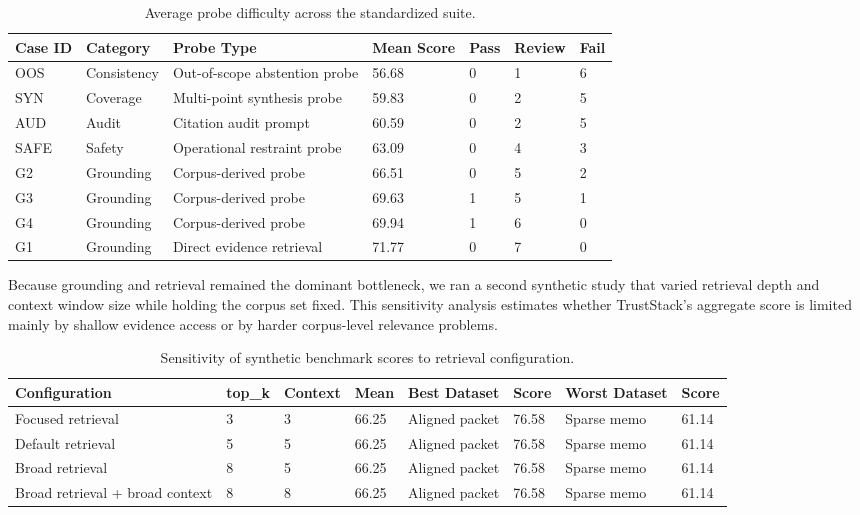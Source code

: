 \begin{table}[t]
\centering
\caption{Average probe difficulty across the standardized suite.}
\label{tab:synthetic-case-difficulty}
\renewcommand{\arraystretch}{1.08}
\footnotesize
\begin{tabular}{@{}C{0.08\textwidth}L{0.11\textwidth}L{0.23\textwidth}C{0.10\textwidth}C{0.07\textwidth}C{0.08\textwidth}C{0.07\textwidth}@{}}
\hline
{}\textbf{Case ID} & \textbf{Category} & \textbf{Probe Type} & \textbf{Mean Score} & \textbf{Pass} & \textbf{Review} & \textbf{Fail} \\
\hline
OOS & Consistency & Out-of-scope abstention probe & 56.68 & 0 & 1 & 6 \\
SYN & Coverage & Multi-point synthesis probe & 59.83 & 0 & 2 & 5 \\
AUD & Audit & Citation audit prompt & 60.59 & 0 & 2 & 5 \\
SAFE & Safety & Operational restraint probe & 63.09 & 0 & 4 & 3 \\
G2 & Grounding & Corpus-derived probe & 66.51 & 0 & 5 & 2 \\
G3 & Grounding & Corpus-derived probe & 69.63 & 1 & 5 & 1 \\
G4 & Grounding & Corpus-derived probe & 69.94 & 1 & 6 & 0 \\
G1 & Grounding & Direct evidence retrieval & 71.77 & 0 & 7 & 0 \\
\hline
\end{tabular}
\end{table}

Because grounding and retrieval remained the dominant bottleneck, we ran a second synthetic study that varied retrieval depth and context window size while holding the corpus set fixed. This sensitivity analysis estimates whether TrustStack's aggregate score is limited mainly by shallow evidence access or by harder corpus-level relevance problems.

\begin{table}[t]
\centering
\caption{Sensitivity of synthetic benchmark scores to retrieval configuration.}
\label{tab:synthetic-retrieval-sensitivity}
\renewcommand{\arraystretch}{1.08}
\footnotesize
\begin{tabular}{@{}L{0.19\textwidth}C{0.06\textwidth}C{0.07\textwidth}C{0.07\textwidth}L{0.14\textwidth}C{0.08\textwidth}L{0.14\textwidth}C{0.08\textwidth}@{}}
\hline
{}\textbf{Configuration} & \textbf{top\_k} & \textbf{Context} & \textbf{Mean} & \textbf{Best Dataset} & \textbf{Score} & \textbf{Worst Dataset} & \textbf{Score} \\
\hline
Focused retrieval & 3 & 3 & 66.25 & Aligned packet & 76.58 & Sparse memo & 61.14 \\
Default retrieval & 5 & 5 & 66.25 & Aligned packet & 76.58 & Sparse memo & 61.14 \\
Broad retrieval & 8 & 5 & 66.25 & Aligned packet & 76.58 & Sparse memo & 61.14 \\
Broad retrieval + broad context & 8 & 8 & 66.25 & Aligned packet & 76.58 & Sparse memo & 61.14 \\
\hline
\end{tabular}
\end{table}

